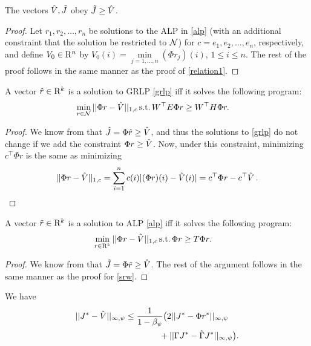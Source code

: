 \begin{lemma}\label{relation2}
The vectors $\hat{V},\tilde{J}$ obey $\tilde{J}\geq\hat{V}$.
\end{lemma}
\begin{proof}
Let $ r_1,  r_2,\ldots, r_n$ be solutions to the ALP in \eqref{alp} (with an additional constraint that the solution be restricted to $\mathcal{N}$) for $c=e_1, e_2,\ldots,e_n$, respectively,
and define $V_0\in \mathrm{R}^n$ by $V_0(i)=\underset{j=1,\ldots,n}{\min}(\Phi r_j)(i)$, $1\le i \le n$. The rest of the proof 
follows in the same manner as the proof of \cref{relation1}.
\end{proof}
\begin{lemma}\label{srw}
A vector
$\hat{r} \in \mathrm{R}^k$ is a solution to GRLP \eqref{grlp} iff it solves the following program:
\begin{align}\label{grlpeqprog}
\begin{split}
\min_{r\in \N}\, &||\Phi r-\hv||_{1,c}\,\mb
\text{s.t.}\mb \, W^\top E \Phi r\geq W^\top H \Phi r.
\end{split}
\end{align}
\end{lemma}
\begin{proof}
We know from  that $\hat{J} = \Phi \hat{r} \geq\hat{V}$, and thus
the solutions to \eqref{grlp} do not change if we add the constraint $\Phi r \ge \hat{V}$.
Now, under this constraint, minimizing $c^\top \Phi r$ is the same as minimizing 
\begin{align*}
||\Phi r-\hat{V}||_{1,c}=\sum_{i=1}^n c(i) |(\Phi r)(i)-\hat{V}(i)|=c^\top \Phi r-c^\top \hat{V}\,.
\end{align*} 
\end{proof}
\begin{lemma}\label{srwalp}
A vector
$\tilde{r} \in \mathrm{R}^k$ is a solution to ALP \eqref{alp} iff it solves the following program:
\begin{align}\label{grlpeqprog}
\begin{split}
\min_{r\in \R^k}\, &||\Phi r-\hv||_{1,c}\,\mb
\text{s.t.}\mb \, \Phi r\geq  T \Phi r.
\end{split}
\end{align}
\end{lemma}
\begin{proof}
We know from  that $\tilde{J} = \Phi \tilde{r} \geq\hat{V}$.
The rest of the argument follows in the same manner as the proof for \cref{srw}.
\end{proof}
\begin{lemma}\label{cmt1mn}
We have
\begin{align}
||J^*-\hat{V}||_{\infty,\psi}
& \leq \frac{1}{{1-\beta_{\psi}}}\big(2||J^*-\Phi r^*||_{\infty,\psi}
\nonumber\\
& {}\qquad \qquad+||\Gamma J^*-\hat{\Gamma} J^*||_{\infty,\psi}\big).
\end{align}
\end{lemma}
